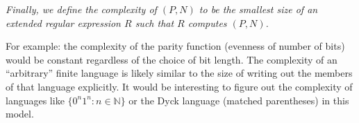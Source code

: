 \documentclass{article}
\begin{document}
\textit{Finally, we define the \emph{complexity} of $(P, N)$ to be the smallest size of an extended regular expression $R$ such that $R$ computes $(P, N)$.}

For example: the complexity of the parity function (evenness of number of bits) would be constant
regardless of the choice of bit length.
The complexity of an ``arbitrary'' finite language is likely similar to the size of writing
out the members of that language explicitly.
It would be interesting to figure out the complexity of languages like
$\{ 0^n 1^n: n \in \mathbb{N} \}$
or the Dyck language (matched parentheses) in this model.
\end{document}
